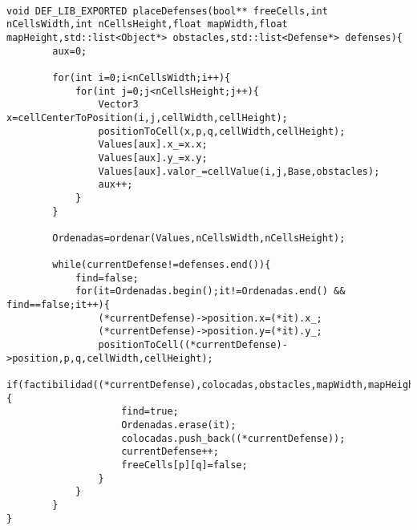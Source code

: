 \begin{lstlisting}
    
void DEF_LIB_EXPORTED placeDefenses(bool** freeCells,int nCellsWidth,int nCellsHeight,float mapWidth,float mapHeight,std::list<Object*> obstacles,std::list<Defense*> defenses){
        aux=0;
    
        for(int i=0;i<nCellsWidth;i++){
            for(int j=0;j<nCellsHeight;j++){
                Vector3 x=cellCenterToPosition(i,j,cellWidth,cellHeight);
                positionToCell(x,p,q,cellWidth,cellHeight);
                Values[aux].x_=x.x;
                Values[aux].y_=x.y;
                Values[aux].valor_=cellValue(i,j,Base,obstacles);
                aux++;
            }
        }
    
        Ordenadas=ordenar(Values,nCellsWidth,nCellsHeight);
    
        while(currentDefense!=defenses.end()){
            find=false;
            for(it=Ordenadas.begin();it!=Ordenadas.end() && find==false;it++){
                (*currentDefense)->position.x=(*it).x_;
                (*currentDefense)->position.y=(*it).y_;
                positionToCell((*currentDefense)->position,p,q,cellWidth,cellHeight);
                if(factibilidad((*currentDefense),colocadas,obstacles,mapWidth,mapHeight,freeCells,p,q)){
                    find=true;
                    Ordenadas.erase(it);
                    colocadas.push_back((*currentDefense));
                    currentDefense++;
                    freeCells[p][q]=false;
                }
            }
        }
}

\end{lstlisting}